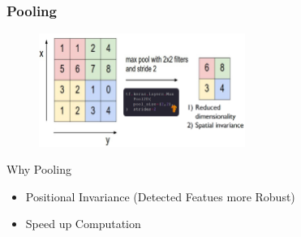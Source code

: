 \documentclass{ctexbeamer}
\begin{document}
\begin{frame}
  \frametitle{Pooling}
  \begin{figure}[H]
    \centering
    \includegraphics[width=0.6\textwidth]{./figures/pooling.png}
    \label{fig:pooling}
  \end{figure}
  \begin{block}{Why Pooling}
    \begin{itemize}
      \item Positional Invariance (Detected Featues more Robust)
      \item Speed up Computation
    \end{itemize}
  \end{block}
\end{frame}
\end{document}
